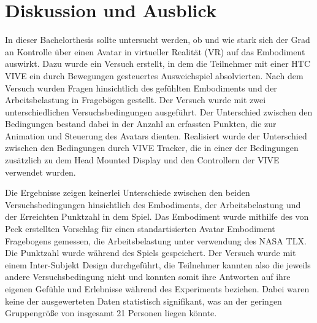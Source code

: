 \chapter{Diskussion und Ausblick}
In dieser Bachelorthesis sollte untersucht werden, ob und wie stark sich der Grad an Kontrolle über einen Avatar in virtueller Realität (VR) auf das Embodiment auswirkt. Dazu wurde ein Versuch erstellt, in dem die Teilnehmer mit einer HTC VIVE ein durch Bewegungen gesteuertes Ausweichspiel absolvierten. Nach dem Versuch wurden Fragen hinsichtlich des gefühlten Embodiments und der Arbeitsbelastung in Fragebögen gestellt. 
Der Versuch wurde mit zwei unterschiedlichen Versuchsbedingungen ausgeführt. Der Unterschied zwischen den Bedingungen bestand dabei in der Anzahl an erfassten Punkten, die zur Animation und Steuerung des Avatars dienten. Realisiert wurde der Unterschied zwischen den Bedingungen durch VIVE Tracker, die in einer der Bedingungen zusätzlich zu dem Head Mounted Display und den Controllern der VIVE verwendet wurden.

Die Ergebnisse zeigen keinerlei Unterschiede zwischen den beiden Versuchsbedingungen hinsichtlich des Embodiments, der Arbeitsbelastung und der Erreichten Punktzahl in dem Spiel. Das Embodiment wurde mithilfe des von Peck erstellten Vorschlag für einen standartisierten Avatar Embodiment Fragebogens gemessen, die Arbeitsbelastung unter verwendung des NASA TLX. Die Punktzahl wurde während des Spiels gespeichert. Der Versuch wurde mit einem Inter-Subjekt Design durchgeführt, die Teilnehmer kannten also die jeweils andere Versuchsbedingung nicht und konnten somit ihre Antworten auf ihre eigenen Gefühle und Erlebnisse während des Experiments beziehen. Dabei waren keine der ausgewerteten Daten statistisch signifikant, was an der geringen Gruppengröße von insgesamt 21 Personen liegen könnte.

